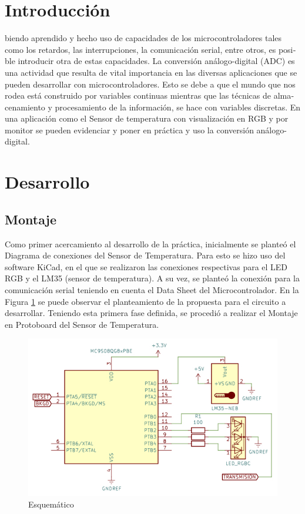 \documentclass[journal]{IEEEtran}
\begin{document}
\begin{otherlanguage}{spanish}
\section{Introducción}
biendo aprendido y hecho uso de capacidades de los microcontroladores tales como los retardos, las interrupciones, la comunicación serial, entre otros, es posible introducir otra de estas capacidades. La conversión análogo-digital (ADC) es una actividad que resulta de vital importancia en las diversas aplicaciones que se pueden desarrollar con microcontroladores. Esto se debe a que el mundo que nos rodea está construido por variables continuas mientras que las técnicas de almacenamiento y procesamiento de la información, se hace con variables discretas. En una aplicación como el Sensor de temperatura con visualización en RGB y por monitor se pueden evidenciar y poner en práctica y uso la conversión análogo-digital.

\section{Desarrollo}

\subsection{Montaje}
Como primer acercamiento al desarrollo de la práctica, inicialmente se planteó el Diagrama de conexiones del Sensor de Temperatura. Para esto se hizo uso del software KiCad, en el que se realizaron las conexiones respectivas para el LED RGB y el LM35 (sensor de temperatura). A su vez, se planteó la conexión para la comunicación serial teniendo en cuenta el Data Sheet del Microcontrolador. En la Figura \ref{E} se puede observar el planteamiento de la propuesta para el circuito a desarrollar. Teniendo esta primera fase definida, se procedió a realizar el Montaje en Protoboard del Sensor de Temperatura.

\begin{figure}[H]
    \centering
    \includegraphics[scale=0.4]{Imágenes/Esquema5.jpg}
    \caption{Esquemático}
    \label{E}
\end{figure}


\end{otherlanguage}
\end{document}
